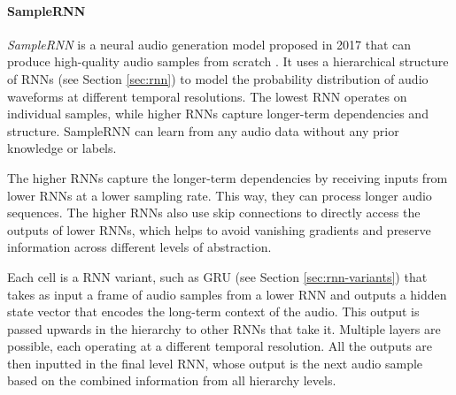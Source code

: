 \paragraph{SampleRNN} \label{sec:samplernn}

\textit{SampleRNN} is a neural audio generation model proposed in 2017 that can produce high-quality audio samples from scratch \cite{mehri_samplernn_2017}. It uses a hierarchical structure of \acp{RNN} (see Section \ref{sec:rnn}) to model the probability distribution of audio waveforms at different temporal resolutions. The lowest \ac{RNN} operates on individual samples, while higher \acp{RNN} capture longer-term dependencies and structure. SampleRNN can learn from any audio data without any prior knowledge or labels.

The higher \acp{RNN} capture the longer-term dependencies by receiving inputs from lower \acp{RNN} at a lower sampling rate. This way, they can process longer audio sequences. The higher \acp{RNN} also use skip connections to directly access the outputs of lower \acp{RNN}, which helps to avoid vanishing gradients and preserve information across different levels of abstraction.

Each cell is a \ac{RNN} variant, such as \ac{GRU} (see Section \ref{sec:rnn-variants}) that takes as input a frame of audio samples from a lower \ac{RNN} and outputs a hidden state vector that encodes the long-term context of the audio. This output is passed upwards in the hierarchy to other \acp{RNN} that take it. Multiple layers are possible, each operating at a different temporal resolution. All the outputs are then inputted in the final level \ac{RNN}, whose output is the next audio sample based on the combined information from all hierarchy levels.